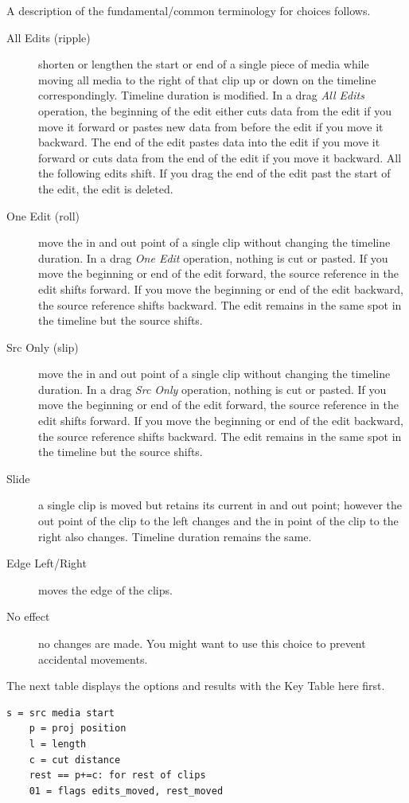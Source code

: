 A description of the fundamental/common terminology for choices
follows.

\begin{description}
\item[All Edits (ripple)] shorten or lengthen the start or end
  of a single piece of media while moving all media to the right of
  that clip up or down on the timeline correspondingly.  Timeline
  duration is modified.  In a drag \textit{All Edits} operation, the
  beginning of the edit either cuts data from the edit if you move it
  forward or pastes new data from before the edit if you move it
  backward. The end of the edit pastes data into the edit if you move
  it forward or cuts data from the end of the edit if you move it
  backward. All the following edits shift. If you drag the end of the
  edit past the start of the edit, the edit is deleted.
\item[One Edit (roll)] move the in and out point of a single
  clip without changing the timeline duration. In a drag \textit{One
    Edit} operation, nothing is cut or pasted. If you move the beginning
  or end of the edit forward, the source reference in the edit shifts
  forward. If you move the beginning or end of the edit backward, the
  source reference shifts backward. The edit remains in the same spot
  in the timeline but the source shifts.
\item[Src Only (slip)] move the in and out point of a single
  clip without changing the timeline duration. In a drag \textit{Src
    Only} operation, nothing is cut or pasted. If you move the beginning
  or end of the edit forward, the source reference in the edit shifts
  forward. If you move the beginning or end of the edit backward, the
  source reference shifts backward. The edit remains in the same spot
  in the timeline but the source shifts.
\item[Slide] a single clip is moved but retains its current in
  and out point; however the out point of the clip to the left changes
  and the in point of the clip to the right also changes.  Timeline
  duration remains the same.
\item[Edge Left/Right] moves the edge of the clips.
\item[No effect] no changes are made.  You might want to use
  this choice to prevent accidental movements.
\end{description}

The next table displays the options and results
with the Key Table here first.

\begin{lstlisting}[style=sh]
    s = src media start
    p = proj position
    l = length
    c = cut distance
    rest == p+=c: for rest of clips
    01 = flags edits_moved, rest_moved
\end{lstlisting}

